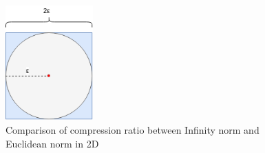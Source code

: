 
\begin{figure}
    \centering
    \includegraphics[width=0.3\textwidth]{figures/2D_Comparison.png}
    \caption{Comparison of compression ratio between Infinity norm and Euclidean norm in 2D}
    \label{fig:norm-comparison-2D}
\end{figure}

